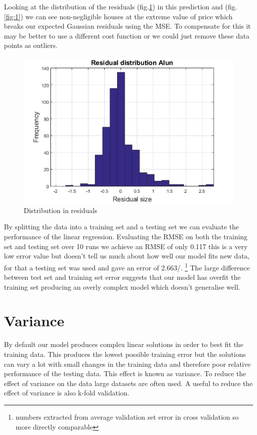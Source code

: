 \documentclass[a4paper,11pt, twocolumn]{article}
\begin{document}
Looking at the distribution of the residuals (fig.\ref{fig:2}) in this prediction and  (fig.\ref{fig:1}) we can see non-negligible houses at the extreme value of price which breaks our expected Gaussian residuals using the MSE. To compensate for this it may be better to use a different cost function or we could just remove these data points as outliers. 

\begin{figure}[ht]
	\includegraphics[width=0.8\linewidth]{figure2.jpg}
	\centering
	\caption{Distribution in residuals}
		\label{fig:2}
\end{figure}

By splitting the data into a training set and a testing set we can evaluate the performance of the linear regression. Evaluating the RMSE on both the training set and testing set over 10 runs we achieve an RMSE of only 0.117 this is a very low error value but doesn't tell us much about how well our model fits new data, for that a testing set was used and gave an error of 2.663/. \footnote{numbers extracted from average validation set error in cross validation so more directly comparable} The large difference between test set and training set error suggests that our model has overfit the training set producing an overly complex model which doesn't generalise well. 
\section{Variance}
By default our model produces complex linear solutions in order to best fit the training data. This produces the lowest possible training error but the solutions can vary a lot with small changes in the training data and therefore poor relative performance of the testing data. This effect is known as variance. To reduce the effect of variance on the data large datasets are often used. A useful to reduce the effect of variance is also k-fold validation.
\end{document}
